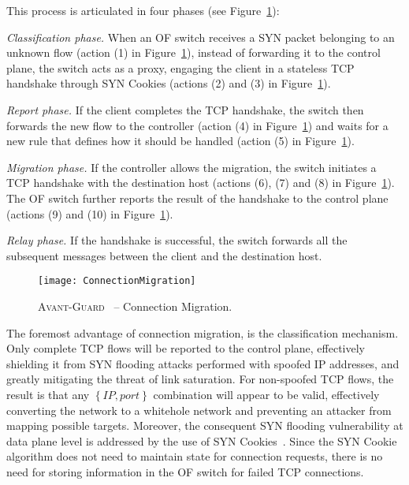 \documentclass{sig-alternate}
\newcommand{\avantguard}{\textsc{Avant-Guard}}
\begin{document}
This process is articulated in four phases (see Figure~\ref{fig:conn_migration}):

		{\em Classification phase.} When an OF switch receives a SYN packet belonging to an unknown flow (action (1) in Figure~\ref{fig:conn_migration}), instead of forwarding it to the control plane, the switch acts as a proxy, engaging the client in a stateless TCP handshake through SYN Cookies (actions (2) and (3) in Figure~\ref{fig:conn_migration}).
		
		{\em Report phase.} If the client completes the TCP handshake, the switch then forwards the new flow to the controller (action (4) in Figure~\ref{fig:conn_migration}) and waits for a new rule that defines how it should be handled (action (5) in Figure~\ref{fig:conn_migration}).
		
		{\em Migration phase.} If the controller allows the migration, the switch initiates a TCP handshake with the destination host (actions (6), (7) and (8) in Figure~\ref{fig:conn_migration}). The OF switch further reports the result of the handshake to the control plane (actions (9) and (10) in Figure~\ref{fig:conn_migration}).
		
		{\em Relay phase.} If the handshake is successful, the switch forwards all the subsequent messages between the client and the destination host.

	\begin{figure}[!ht]
	    \centering
	    \texttt{[image: ConnectionMigration]}
	    \caption{\avantguard~\cite{AvantGuard} -- Connection Migration.}
	    \label{fig:conn_migration}
	\end{figure}

The foremost advantage of connection migration, is the classification mechanism. 
Only complete TCP flows will be reported to the control plane, effectively shielding it from SYN 
flooding attacks performed with spoofed IP addresses, and greatly mitigating the threat of link saturation. 
For non-spoofed TCP flows, the result is that any $\left\{ {IP, port } \right\}$ combination will appear to be valid, 
effectively converting the network to a whitehole network and preventing an attacker from mapping possible targets.
Moreover, the consequent SYN flooding vulnerability at data plane level is addressed by the use of SYN Cookies~\cite{syncookies}. 
Since the SYN Cookie algorithm does not need to maintain state for connection requests, 
there is no need for storing information in the OF switch for failed TCP connections.
\end{document}
